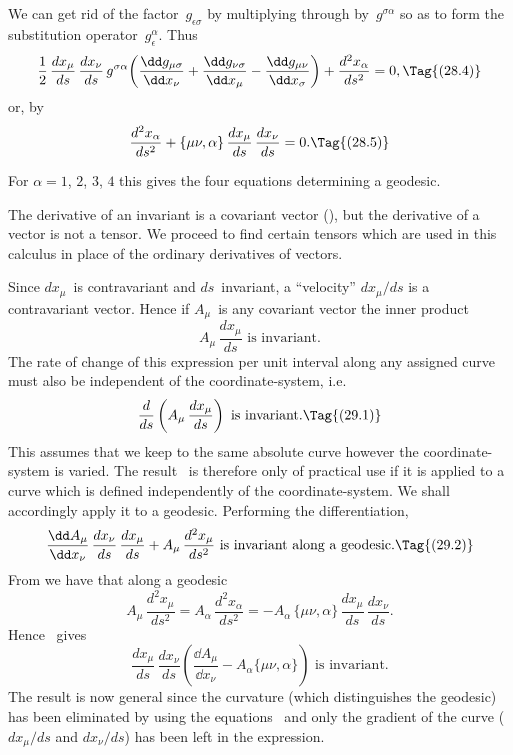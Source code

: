 \documentclass[12pt]{book}
\begin{document}
We can get rid of the factor~$g_{\epsilon\sigma}$ by multiplying through by~$g^{\sigma\alpha}$ so as to
form the substitution operator~$g_{\epsilon}^{\alpha}$. Thus
\[
\frac{1}{2}\, \frac{dx_{\mu}}{ds}\, \frac{dx_{\nu}}{ds}\,
g^{\sigma\alpha} \biggl(\frac{\dd g_{\mu\sigma}}{\dd x_{\nu}} + \frac{\dd g_{\nu\sigma}}{\dd x_{\mu}} - \frac{\dd g_{\mu\nu}}{\dd x_{\sigma}}\biggr)
+ \frac{d^{2} x_{\alpha}}{ds^{2}} = 0,
\Tag{(28.4)}
\]
or, by~
\[
\frac{d^{2} x_{\alpha}}{ds^{2}} + \{\mu\nu, \alpha\}\, \frac{dx_{\mu}}{ds}\, \frac{dx_{\nu}}{ds} = 0.
\Tag{(28.5)}
\]

For $\alpha = 1$, $2$, $3$, $4$ this gives the four equations determining a geodesic.

%
%

The derivative of an invariant is a covariant vector (), but the
derivative of a vector is not a tensor. We proceed to find certain tensors
which are used in this calculus in place of the ordinary derivatives of vectors.

Since $dx_{\mu}$~is contravariant and $ds$~invariant, a ``velocity'' $dx_{\mu}/ds$ is a
contravariant vector. Hence if $A_{\mu}$~is any covariant vector the inner product
\[
A_{\mu}\, \frac{dx_{\mu}}{ds} \text{ is invariant.}
\]
The rate of change of this expression per unit interval along any assigned
curve must also be independent of the coordinate\hyp{}system, i.e.\
\[
\frac{d}{ds} \left(A_{\mu}\, \frac{dx_{\mu}}{ds}\right)
\text{ is invariant.}
\Tag{(29.1)}
\]
This assumes that we keep to the same absolute curve however the coordinate\hyp{}system
is varied. The result~\Eq{(29.1)} is therefore only of practical use if it is
applied to a curve which is defined independently of the coordinate\hyp{}system.
We shall accordingly apply it to a geodesic. Performing the differentiation,
\[
\frac{\dd A_{\mu}}{\dd x_{\nu}}\, \frac{dx_{\nu}}{ds}\, \frac{dx_{\mu}}{ds}
+ A_{\mu}\, \frac{d^{2}x_{\mu}}{ds^{2}} \text{ is invariant along a geodesic.}
\Tag{(29.2)}
\]
From  we have that along a geodesic
\[
A_{\mu}\, \frac{d^{2}x_{\mu}}{ds^{2}} = A_{\alpha}\, \frac{d^{2}x_{\alpha}}{ds^{2}}
= -A_{\alpha}\, \{\mu\nu, \alpha\}\, \frac{dx_{\mu}}{ds}\, \frac{dx_{\nu}}{ds}.
\]
Hence ~gives
\[
\frac{dx_{\mu}}{ds}\, \frac{dx_{\nu}}{ds} \left(\frac{\dd A_{\mu}}{\dd x_{\nu}} - A_{\alpha} \{\mu\nu, \alpha\}\right) \text{ is invariant.}
\]
The result is now general since the curvature (which distinguishes the
geodesic) has been eliminated by using the equations~\Eq{(28.5)} and only the
gradient of the curve ($dx_{\mu}/ds$ and $dx_{\nu}/ds$) has been left in the expression.
\end{document}
